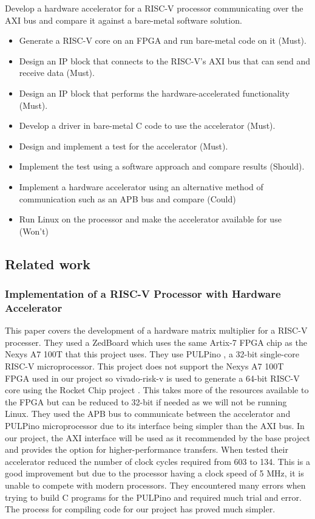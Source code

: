 Develop a hardware accelerator for a RISC-V processor communicating over the AXI bus and compare it against a bare-metal software solution.

\begin{itemize}
	\item Generate a RISC-V core on an FPGA and run bare-metal code on it (Must).
	\item Design an IP block that connects to the RISC-V's AXI bus that can send and receive data (Must).
	\item Design an IP block that performs the hardware-accelerated functionality (Must).
	\item Develop a driver in bare-metal C code to use the accelerator (Must).
	\item Design and implement a test for the accelerator (Must).
	\item Implement the test using a software approach and compare results (Should).
	\item Implement a hardware accelerator using an alternative method of communication such as an APB bus and compare (Could)
	\item Run Linux on the processor and make the accelerator available for use (Won't)
\end{itemize}

\subsection{Related work}
\subsubsection{Implementation of a RISC-V Processor with Hardware Accelerator \cite{risc-v_hard_accel}}
This paper covers the development of a hardware matrix multiplier for a RISC-V processer. They used a ZedBoard which uses the same Artix-7 FPGA chip as the Nexys A7 100T that this project uses. They use PULPino \cite{pulpino}, a 32-bit single-core RISC-V microprocessor. This project does not support the Nexys A7 100T FPGA used in our project so vivado-risk-v \cite{vivado-risk-v} is used to generate a 64-bit RISC-V core using the Rocket Chip project \cite{rocketchip}. This takes more of the resources available to the FPGA but can be reduced to 32-bit if needed as we will not be running Linux. They used the APB bus to communicate between the accelerator and PULPino microprocessor due to its interface being simpler than the AXI bus. In our project, the AXI interface will be used as it recommended by the base project and provides the option for higher-performance transfers. When tested their accelerator reduced the number of clock cycles required from 603 to 134. This is a good improvement but due to the processor having a clock speed of 5 MHz, it is unable to compete with modern processors. They encountered many errors when trying to build C programs for the PULPino and required much trial and error. The process for compiling code for our project has proved much simpler.

